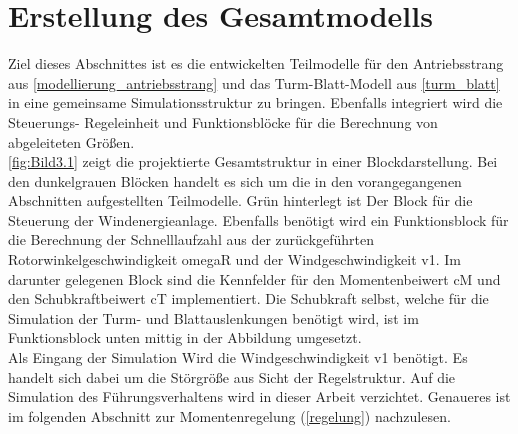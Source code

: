 \section{Erstellung des Gesamtmodells} \label{gesamtmodell}

Ziel dieses Abschnittes ist es die entwickelten Teilmodelle für den Antriebsstrang aus \autoref{modellierung_antriebsstrang} und das Turm-Blatt-Modell aus \autoref{turm_blatt} in eine gemeinsame Simulationsstruktur zu bringen. Ebenfalls integriert wird die Steuerungs- \bzw Regeleinheit und Funktionsblöcke für die Berechnung von abgeleiteten Größen.\\
\autoref{fig:Bild3.1} zeigt die projektierte Gesamtstruktur in einer Blockdarstellung. Bei den dunkelgrauen Blöcken handelt es sich um die in den vorangegangenen Abschnitten aufgestellten Teilmodelle. Grün hinterlegt ist Der Block für die Steuerung der Windenergieanlage. Ebenfalls benötigt wird ein Funktionsblock für die Berechnung der Schnelllaufzahl aus der zurückgeführten Rotorwinkelgeschwindigkeit \acs{omegaR} und der Windgeschwindigkeit \acs{v1}. Im darunter gelegenen Block sind die Kennfelder für den Momentenbeiwert \acs{cM} und den Schubkraftbeiwert \acs{cT} implementiert. Die Schubkraft selbst, welche für die Simulation der Turm- und Blattauslenkungen benötigt wird, ist im Funktionsblock unten mittig in der Abbildung umgesetzt.\\
Als Eingang der Simulation Wird die Windgeschwindigkeit \acs{v1} benötigt. Es handelt sich dabei um die Störgröße aus Sicht der Regelstruktur. Auf die Simulation des Führungsverhaltens wird in dieser Arbeit verzichtet. Genaueres ist im folgenden Abschnitt zur Momentenregelung (\autoref{regelung}) nachzulesen.\\

